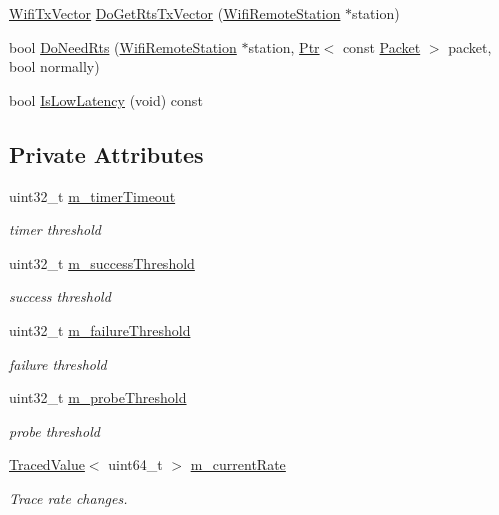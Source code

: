 \begin{DoxyCompactItemize}
\item 
\hyperlink{classns3_1_1WifiTxVector}{Wifi\+Tx\+Vector} \hyperlink{classns3_1_1CaraWifiManager_a2361885b5679a859cb55c0b29da0c1ad}{Do\+Get\+Rts\+Tx\+Vector} (\hyperlink{structns3_1_1WifiRemoteStation}{Wifi\+Remote\+Station} $\ast$station)
\item 
bool \hyperlink{classns3_1_1CaraWifiManager_ae6a123296255be6138b955de8d8a0c38}{Do\+Need\+Rts} (\hyperlink{structns3_1_1WifiRemoteStation}{Wifi\+Remote\+Station} $\ast$station, \hyperlink{classns3_1_1Ptr}{Ptr}$<$ const \hyperlink{classns3_1_1Packet}{Packet} $>$ packet, bool normally)
\item 
bool \hyperlink{classns3_1_1CaraWifiManager_a4a8042e399692118bce51da76a46e7f0}{Is\+Low\+Latency} (void) const 
\end{DoxyCompactItemize}
\subsection*{Private Attributes}
\begin{DoxyCompactItemize}
\item 
uint32\+\_\+t \hyperlink{classns3_1_1CaraWifiManager_a68e0514247378508cad244e261e7fc3d}{m\+\_\+timer\+Timeout}
\begin{DoxyCompactList}\small\item\em timer threshold \end{DoxyCompactList}\item 
uint32\+\_\+t \hyperlink{classns3_1_1CaraWifiManager_a8ab462541b8e54a9d45849946fbce8c7}{m\+\_\+success\+Threshold}
\begin{DoxyCompactList}\small\item\em success threshold \end{DoxyCompactList}\item 
uint32\+\_\+t \hyperlink{classns3_1_1CaraWifiManager_a4558af4c0968838cd480a98624af7a27}{m\+\_\+failure\+Threshold}
\begin{DoxyCompactList}\small\item\em failure threshold \end{DoxyCompactList}\item 
uint32\+\_\+t \hyperlink{classns3_1_1CaraWifiManager_ad08556bdda27678ebce6c1439a8f8845}{m\+\_\+probe\+Threshold}
\begin{DoxyCompactList}\small\item\em probe threshold \end{DoxyCompactList}\item 
\hyperlink{classns3_1_1TracedValue}{Traced\+Value}$<$ uint64\+\_\+t $>$ \hyperlink{classns3_1_1CaraWifiManager_abe69c294ab9d5993c1b5d3e8ae90c91a}{m\+\_\+current\+Rate}
\begin{DoxyCompactList}\small\item\em Trace rate changes. \end{DoxyCompactList}\end{DoxyCompactItemize}

